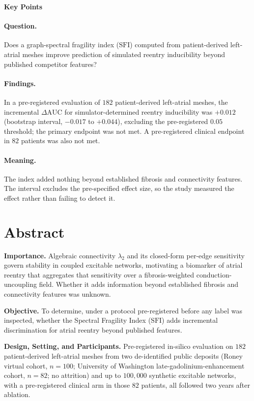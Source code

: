 \documentclass[11pt]{article}
\newcommand{\lam}{\lambda}
\newcommand{\SFI}{\ensuremath{\mathrm{SFI}}}
\newcommand{\dAUC}{\ensuremath{\Delta\mathrm{AUC}}}
\begin{document}
\newpage

\noindent\textbf{Key Points}

\paragraph{Question.} Does a graph-spectral fragility index (\SFI) computed from
patient-derived left-atrial meshes improve prediction of simulated reentry
inducibility beyond published competitor features?

\paragraph{Findings.} In a pre-registered evaluation of $182$ patient-derived
left-atrial meshes, the incremental $\dAUC$ for simulator-determined reentry
inducibility was $+0.012$ (bootstrap interval, $-0.017$ to $+0.044$), excluding
the pre-registered $0.05$ threshold; the primary endpoint was not met. A
pre-registered clinical endpoint in $82$ patients was also not met.

\paragraph{Meaning.} The index added nothing beyond established fibrosis and
connectivity features. The interval excludes the pre-specified effect size, so
the study measured the effect rather than failing to detect it.

\newpage

\section*{Abstract}
\noindent\textbf{Importance.} Algebraic connectivity $\lam_2$ and its
closed-form per-edge sensitivity govern stability in coupled excitable networks,
motivating a biomarker of atrial reentry that aggregates that sensitivity over a
fibrosis-weighted conduction-uncoupling field. Whether it adds information
beyond established fibrosis and connectivity features was unknown.

\medskip
\noindent\textbf{Objective.} To determine, under a protocol pre-registered
before any label was inspected, whether the Spectral Fragility Index (\SFI)
adds incremental discrimination for atrial reentry beyond published features.

\medskip
\noindent\textbf{Design, Setting, and Participants.} Pre-registered in-silico
evaluation on $182$ patient-derived left-atrial meshes from two
de-identified public deposits (Roney virtual cohort, $n=100$; University of Washington
late-gadolinium-enhancement cohort, $n=82$; no attrition) and up to $100{,}000$
synthetic excitable networks, with a pre-registered clinical arm in those $82$
patients, all followed two years after ablation.
\end{document}
